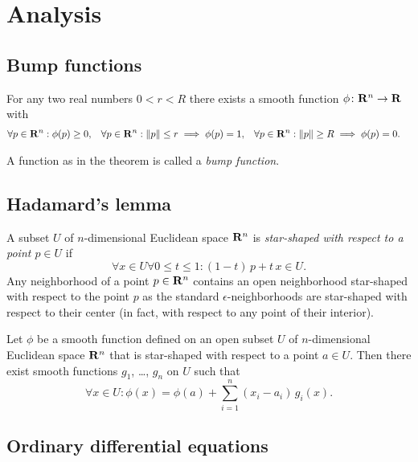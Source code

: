 \chapter{Analysis}

\section{Bump functions}
\label{sec:bump_functions}

\begin{thm}
  \label{thm:bump_function}
  For any two real numbers $0 < r < R$ there exists a smooth
  function $\phi\colon \mathbf{R}^n \to \mathbf{R}$ with
  \begin{align*}
    \forall p \in \mathbf{R}^n: \phi(p) & \ge 0, &
    \forall p \in \mathbf{R}^n: \lVert p\rVert \leq r \implies \phi(p) & = 1, &
    \forall p \in \mathbf{R}^n: \lVert p\rVert \geq R \implies \phi(p) & = 0.
  \end{align*}
\end{thm}

A function as in the theorem is called a \emph{bump function}.

\section{Hadamard's lemma}

A subset $U$ of $n$-dimensional Euclidean space $\mathbf{R}^n$ is \emph{star-shaped with
respect to a point $p \in U$} if
\[
  \forall x \in U \forall 0 \leq t \leq 1 :
  (1 - t) \, p + t \, x \in U.
\]
Any neighborhood of a point $p \in \mathbf{R}^n$ contains an open neighborhood
star-shaped with respect to the point $p$ as the standard $\epsilon$-neighborhoods
are star-shaped with respect to their center (in fact, with respect to any point
of their interior).

\begin{thm}
  \label{thm:hadamard}
  Let $\phi$ be a smooth function defined on an open subset $U$ of $n$-dimensional
  Euclidean space $\mathbf{R}^n$ that is star-shaped with respect to a point $a \in U$.
  Then there exist smooth functions $g_1$, \dots, $g_n$ on $U$ such that
  \[
    \forall x \in U: \phi(x) = \phi(a) + \sum_{i = 1}^n (x_i - a_i) \, g_i(x).
  \]
\end{thm}

\section{Ordinary differential equations}

